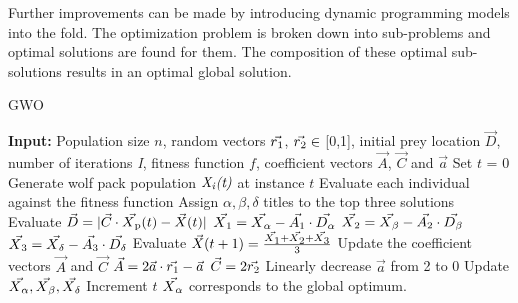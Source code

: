 \documentclass[conference]{IEEEtran}
\theoremstyle{definition}
\begin{document}
% 
% 

Further improvements can be made by introducing dynamic programming models into the fold. The optimization problem is broken down into sub-problems and optimal solutions are found for them. The composition of these optimal sub-solutions results in an optimal global solution.  

\vspace{-0.2cm}




\begin{algorithm}[t]
\scriptsize
\caption{GWO}
\label{alg:gwo}
\begin{algorithmic}[1]
\STATE \textbf{Input:} Population size $\textit{n}$, random vectors $\vec{r\textsubscript{1}}$, $\vec{r\textsubscript{2}} \in$ [0,1], initial prey location $\vec{D}$, number of iterations \textit{I}, fitness function $\textit{f}$, coefficient vectors $\vec{A}$, $\vec{C}$ and $\vec{a}$
\STATE Set $\textit{t}$ = 0
\STATE Generate wolf pack population $\textit{X\textsubscript{i}(t)}$ at instance $\textit{t}$
\STATE Evaluate each individual against the fitness function
\ENDFOR
\STATE Assign $\alpha, \beta, \delta$ titles to the top three solutions
\STATE Evaluate $\vec{D} = |\vec{C} \cdot \vec{X\textsubscript{p}}(t) - \vec{X}(t)|$
\STATE $\vec{X\textsubscript{1}} = \vec{X\textsubscript{$\alpha$}} - \vec{A\textsubscript{1}} \cdot  \vec{D\textsubscript{$\alpha$}}$
\STATE $\vec{X\textsubscript{2}} = \vec{X\textsubscript{$\beta$}} - \vec{A\textsubscript{2}} \cdot  \vec{D\textsubscript{$\beta$}}$
\STATE $\vec{X\textsubscript{3}} = \vec{X\textsubscript{$\delta$}} - \vec{A\textsubscript{3}} \cdot  \vec{D\textsubscript{$\delta$}}$
\STATE Evaluate $\vec{X}(t+1) = \frac{\vec{X\textsubscript{1}} + \vec{X\textsubscript{2}} + \vec{X\textsubscript{3}}}{3}$
\ENDFOR
\STATE Update the coefficient vectors $\vec{A}$ and $\vec{C}$
\STATE $\vec{A} = 2\vec{a} \cdot \vec{r\textsubscript{1}} - \vec{a}$
\STATE $\vec{C} = 2\vec{r\textsubscript{2}}$
\STATE Linearly decrease $\vec{a}$ from 2 to 0
\STATE Update $\vec{X\textsubscript{$\alpha$}}, \vec{X\textsubscript{$\beta$}}, \vec{X\textsubscript{$\delta$}}$
\STATE Increment $\textit{t}$
\ENDFOR
\STATE $\vec{X\textsubscript{$\alpha$}}$ corresponds to the global optimum. 
\end{algorithmic}
\end{algorithm}
\end{document}
